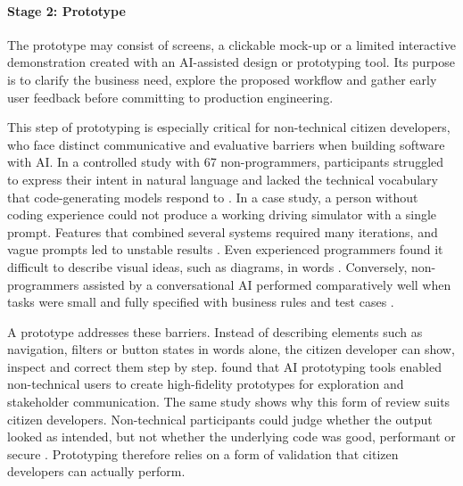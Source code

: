 \documentclass[10pt,a4paper]{article}
\begin{document}
\paragraph{Stage 2: Prototype}

The prototype may consist of screens, a clickable mock-up or a limited interactive demonstration created with an AI-assisted design or prototyping tool. Its purpose is to clarify the business need, explore the proposed workflow and gather early user feedback before committing to production engineering.  

This step of prototyping is especially critical for non-technical citizen developers, who face distinct communicative and evaluative barriers when building software with AI. In a controlled study with 67 non-programmers, participants struggled to express their intent in natural language and lacked the technical vocabulary that code-generating models respond to \parencite{feldman2024}. In a case study, a person without coding experience could not produce a working driving simulator with a single prompt. Features that combined several systems required many iterations, and vague prompts led to unstable results \parencite{fortesferreira2025}. Even experienced programmers found it difficult to describe visual ideas, such as diagrams, in words \parencite{sarkar2025}. Conversely, non-programmers assisted by a conversational AI performed comparatively well when tasks were small and fully specified with business rules and test cases \parencite{esnaola2026}. 


A prototype addresses these barriers. Instead of describing elements such as navigation, filters or button states in words alone, the citizen developer can show, inspect and correct them step by step. \textcite{kobiella2026} found that AI prototyping tools enabled non-technical users to create high-fidelity prototypes for exploration and stakeholder communication. The same study shows why this form of review suits citizen developers. Non-technical participants could judge whether the output looked as intended, but not whether the underlying code was good, performant or secure \parencite{kobiella2026}. Prototyping therefore relies on a form of validation that citizen developers can actually perform.
\end{document}
